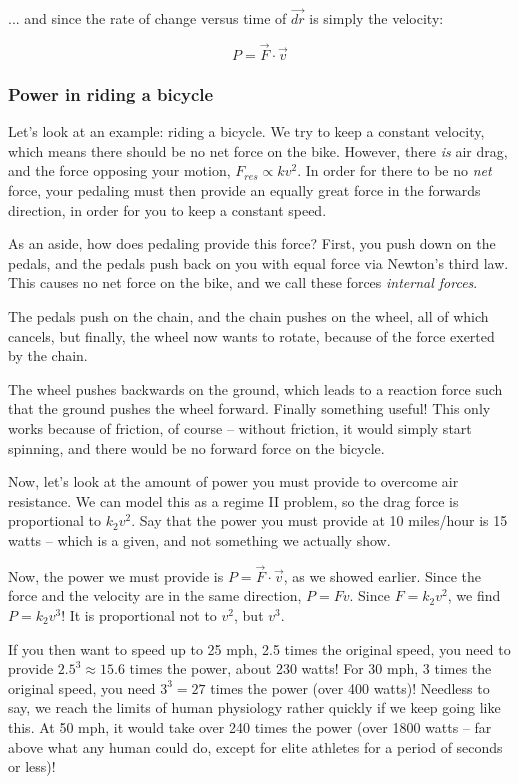 ... and since the rate of change versus time of $\vec{dr}$ is simply the velocity:

\begin{equation}
P = \vec{F} \cdot \vec{v}
\end{equation}

\subsubsection{Power in riding a bicycle}

Let's look at an example: riding a bicycle. We try to keep a constant velocity, which means there should be no net force on the bike. However, there \emph{is} air drag, and the force opposing your motion, $F_{res} \propto k v^2$. In order for there to be no \emph{net} force, your pedaling must then provide an equally great force in the forwards direction, in order for you to keep a constant speed.

As an aside, how does pedaling provide this force? First, you push down on the pedals, and the pedals push back on you with equal force via Newton's third law. This causes no net force on the bike, and we call these forces \emph{internal forces}.

The pedals push on the chain, and the chain pushes on the wheel, all of which cancels, but finally, the wheel now wants to rotate, because of the force exerted by the chain.

The wheel pushes backwards on the ground, which leads to a reaction force such that the ground pushes the wheel forward. Finally something useful! This only works because of friction, of course -- without friction, it would simply start spinning, and there would be no forward force on the bicycle.

Now, let's look at the amount of power you must provide to overcome air resistance. We can model this as a regime II problem, so the drag force is proportional to $k_2 v^2$. Say that the power you must provide at 10 miles/hour is 15 watts -- which is a given, and not something we actually show.

Now, the power we must provide is $P = \vec{F} \cdot \vec{v}$, as we showed earlier. Since the force and the velocity are in the same direction, $P = F v$. Since $F = k_2 v^2$, we find $P = k_2 v^3$! It is proportional not to $v^2$, but $v^3$.

If you then want to speed up to 25 mph, 2.5 times the original speed, you need to provide $2.5^{3} \approx 15.6$ times the power, about 230 watts! For 30 mph, 3 times the original speed, you need $3^3 = 27$ times the power (over 400 watts)! Needless to say, we reach the limits of human physiology rather quickly if we keep going like this. At 50 mph, it would take over 240 times the power (over 1800 watts -- far above what any human could do, except for elite athletes for a period of seconds or less)!

